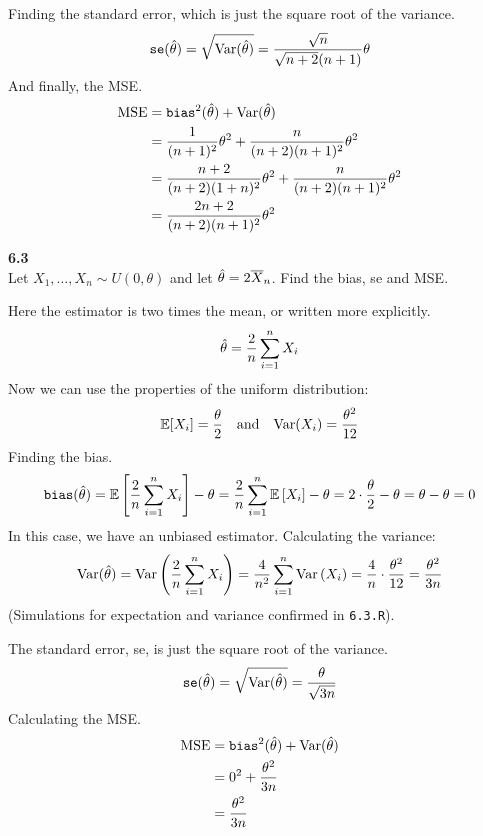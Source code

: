 Finding the standard error, which is just the square root of the variance.
$$
\texttt{se}(\hat{\theta}) = \sqrt{\text{Var}(\hat{\theta})} = \frac{\sqrt{n}}{\sqrt{n+2}(n+1)}\theta
$$
And finally, the MSE.
\begin{align*}
    \text{MSE} &= \texttt{bias}^2(\hat{\theta}) + \text{Var}(\hat{\theta}) \\
    &= \frac{1}{(n+1)^2}\theta^2 + \frac{n}{(n+2)(n+1)^2}\theta^2 \\
    &= \frac{n+2}{(n+2)(1+n)^2}\theta^2 + \frac{n}{(n+2)(n+1)^2}\theta^2\\
    &= \frac{2n + 2}{(n+2)(n+1)^2}\theta^2
\end{align*}

\bigskip\noindent
\textbf{6.3}\\  %
Let $X_1,\ldots, X_n\sim U(0, \theta)$ and let $\hat{\theta} = 2\overline{X}_n$. Find the
bias, se and MSE.

\medskip\noindent
Here the estimator is two times the mean, or written more explicitly.
$$
\hat{\theta} = \frac{2}{n}\sum_{i=1}^n X_i
$$
Now we can use the properties of the uniform distribution:
$$
\mathbb{E}[X_i] = \frac{\theta}{2}\quad\text{and}\quad
\text{Var}(X_i) = \frac{\theta^2}{12}
$$
Finding the bias.
$$
\texttt{bias}(\hat{\theta}) = \mathbb{E}\left[\frac{2}{n}\sum_{i=1}^n X_i\right] - \theta
= \frac{2}{n}\sum_{i=1}^n \mathbb{E}\left[X_i\right] - \theta
= 2\cdot\frac{\theta}{2} - \theta = \theta - \theta = 0
$$
In this case, we have an unbiased estimator. Calculating the variance:
$$
\text{Var}(\hat{\theta}) = \text{Var}\left(\frac{2}{n}\sum_{i=1}^n X_i\right)
= \frac{4}{n^2}\sum_{i=1}^n  \text{Var}\left(X_i\right)
= \frac{4}{n}\cdot \frac{\theta^2}{12}
= \frac{\theta^2}{3n}
$$
(Simulations for expectation and variance confirmed in \texttt{6.3.R}).

\newpage\noindent
The standard error, se, is just the square root of the variance.
$$
\texttt{se}(\hat{\theta}) = \sqrt{\text{Var}(\hat{\theta})} = \frac{\theta}{\sqrt{3n}}
$$
Calculating the MSE.
\begin{align*}
    \text{MSE} &= \texttt{bias}^2(\hat{\theta}) + \text{Var}(\hat{\theta}) \\
    &= 0^2 + \frac{\theta^2}{3n} \\
    &= \frac{\theta^2}{3n}
\end{align*}


